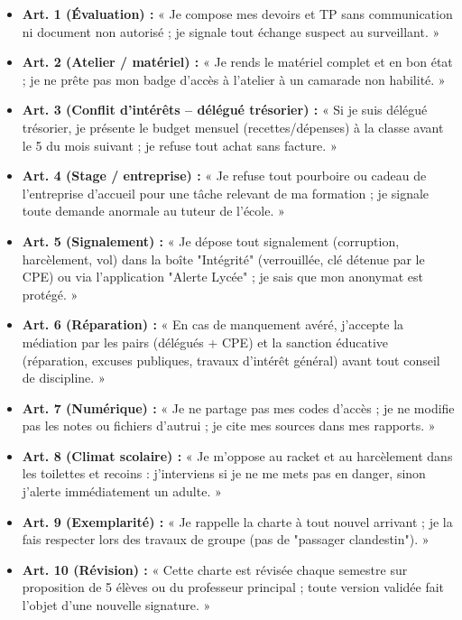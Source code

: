 \documentclass[11pt]{article}
\begin{document}
\begin{exemplebox}
\begin{itemize}
    \item \textbf{Art. 1 (Évaluation) :} « Je compose mes devoirs et TP sans communication ni document non autorisé ; je signale tout échange suspect au surveillant. »
    \item \textbf{Art. 2 (Atelier / matériel) :} « Je rends le matériel complet et en bon état ; je ne prête pas mon badge d'accès à l'atelier à un camarade non habilité. »
    \item \textbf{Art. 3 (Conflit d'intérêts -- délégué trésorier) :} « Si je suis délégué trésorier, je présente le budget mensuel (recettes/dépenses) à la classe avant le 5 du mois suivant ; je refuse tout achat sans facture. »
    \item \textbf{Art. 4 (Stage / entreprise) :} « Je refuse tout pourboire ou cadeau de l'entreprise d'accueil pour une tâche relevant de ma formation ; je signale toute demande anormale au tuteur de l'école. »
    \item \textbf{Art. 5 (Signalement) :} « Je dépose tout signalement (corruption, harcèlement, vol) dans la boîte "Intégrité" (verrouillée, clé détenue par le CPE) ou via l'application "Alerte Lycée" ; je sais que mon anonymat est protégé. »
    \item \textbf{Art. 6 (Réparation) :} « En cas de manquement avéré, j'accepte la médiation par les pairs (délégués + CPE) et la sanction éducative (réparation, excuses publiques, travaux d'intérêt général) avant tout conseil de discipline. »
    \item \textbf{Art. 7 (Numérique) :} « Je ne partage pas mes codes d'accès ; je ne modifie pas les notes ou fichiers d'autrui ; je cite mes sources dans mes rapports. »
    \item \textbf{Art. 8 (Climat scolaire) :} « Je m'oppose au racket et au harcèlement dans les toilettes et recoins : j'interviens si je ne me mets pas en danger, sinon j'alerte immédiatement un adulte. »
    \item \textbf{Art. 9 (Exemplarité) :} « Je rappelle la charte à tout nouvel arrivant ; je la fais respecter lors des travaux de groupe (pas de "passager clandestin"). »
    \item \textbf{Art. 10 (Révision) :} « Cette charte est révisée chaque semestre sur proposition de 5 élèves ou du professeur principal ; toute version validée fait l'objet d'une nouvelle signature. »
\end{itemize}
\end{exemplebox}
\end{document}
